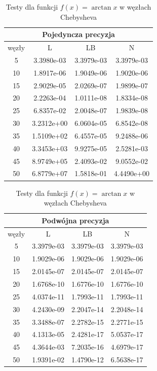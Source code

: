 \documentclass[a4paper]{article}
\begin{document}
\begin{table}[!h]
  \begin{minipage}{.55\linewidth}
    \begin{tabular}{c|ccc}
      \multicolumn{4}{c}{Pojedyncza precyzja}\\
      \hline \hline
      węzły & L & LB & N \\
      \hline
5 & 3.3980e-03 & 3.3979e-03 & 3.3979e-03\\
10 & 1.8917e-06 & 1.9049e-06 & 1.9020e-06\\
15 & 2.9029e-05 & 2.0269e-07 & 1.9899e-07\\
20 & 2.2263e-04 & 1.0111e-08 & 1.8334e-08\\
25 & 6.8357e-02 & 2.0048e-07 & 1.9839e-08\\
30 & 3.2312e+00 & 6.0604e-05 & 6.8542e-08\\
35 & 1.5109e+02 & 6.4557e-05 & 9.2488e-06\\
40 & 3.3453e+03 & 9.9275e-05 & 2.5281e-03\\
45 & 8.9749e+05 & 2.4093e-02 & 9.0552e-02\\
50 & 6.8779e+07 & 1.5818e-01 & 4.4490e+00\\
    \end{tabular}
  \end{minipage}%
  \begin{minipage}{.55\linewidth}
    \begin{tabular}{c|ccc}
      \multicolumn{4}{c}{Podwójna precyzja}\\
      \hline \hline
      węzły & L & LB & N \\
      \hline
5 & 3.3979e-03 & 3.3979e-03 & 3.3979e-03\\
10 & 1.9029e-06 & 1.9029e-06 & 1.9029e-06\\
15 & 2.0145e-07 & 2.0145e-07 & 2.0145e-07\\
20 & 1.6768e-10 & 1.6776e-10 & 1.6776e-10\\
25 & 4.0374e-11 & 1.7993e-11 & 1.7993e-11\\
30 & 4.2430e-09 & 2.2047e-14 & 2.2048e-14\\
35 & 3.3488e-07 & 2.2782e-15 & 2.2771e-15\\
40 & 4.1313e-05 & 2.4281e-17 & 5.0537e-17\\
45 & 4.3644e-03 & 7.2035e-16 & 4.6979e-17\\
50 & 1.9391e-02 & 1.4790e-12 & 6.5638e-17\\
    \end{tabular}
  \end{minipage}
  \caption{Testy dla funkcji $f(x) = \arctan{x}$ w węzłach Chebysheva}
\end{table}
\end{document}
